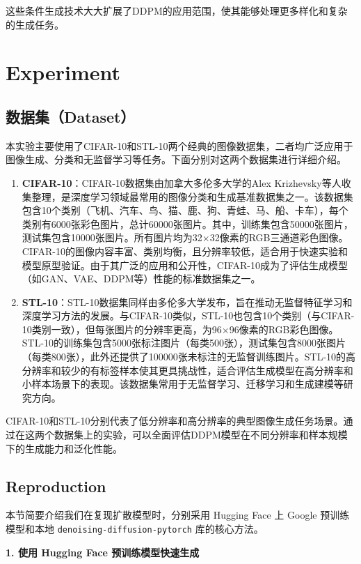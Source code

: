 \documentclass{ctexart}
\begin{document}
\noindent
这些条件生成技术大大扩展了DDPM的应用范围，使其能够处理更多样化和复杂的生成任务。

\section{Experiment}

\subsection{数据集（Dataset）}
\noindent
本实验主要使用了CIFAR-10和STL-10两个经典的图像数据集，二者均广泛应用于图像生成、分类和无监督学习等任务。下面分别对这两个数据集进行详细介绍。

\begin{enumerate}
    \item \textbf{CIFAR-10}：CIFAR-10数据集由加拿大多伦多大学的Alex Krizhevsky等人收集整理，是深度学习领域最常用的图像分类和生成基准数据集之一。该数据集包含10个类别（飞机、汽车、鸟、猫、鹿、狗、青蛙、马、船、卡车），每个类别有6000张彩色图片，总计60000张图片。其中，训练集包含50000张图片，测试集包含10000张图片。所有图片均为32$\times$32像素的RGB三通道彩色图像。CIFAR-10的图像内容丰富、类别均衡，且分辨率较低，适合用于快速实验和模型原型验证。由于其广泛的应用和公开性，CIFAR-10成为了评估生成模型（如GAN、VAE、DDPM等）性能的标准数据集之一。
    \item \textbf{STL-10}：STL-10数据集同样由多伦多大学发布，旨在推动无监督特征学习和深度学习方法的发展。与CIFAR-10类似，STL-10也包含10个类别（与CIFAR-10类别一致），但每张图片的分辨率更高，为96$\times$96像素的RGB彩色图像。STL-10的训练集包含5000张标注图片（每类500张），测试集包含8000张图片（每类800张），此外还提供了100000张未标注的无监督训练图片。STL-10的高分辨率和较少的有标签样本使其更具挑战性，适合评估生成模型在高分辨率和小样本场景下的表现。该数据集常用于无监督学习、迁移学习和生成建模等研究方向。
\end{enumerate}

\noindent
CIFAR-10和STL-10分别代表了低分辨率和高分辨率的典型图像生成任务场景。通过在这两个数据集上的实验，可以全面评估DDPM模型在不同分辨率和样本规模下的生成能力和泛化性能。

\subsection{Reproduction}
\noindent
本节简要介绍我们在复现扩散模型时，分别采用 Hugging Face 上 Google 预训练模型和本地 \texttt{denoising-diffusion-pytorch} 库的核心方法。

\vspace{0.5em}
\noindent
\textbf{1. 使用 Hugging Face 预训练模型快速生成}
\end{document}
